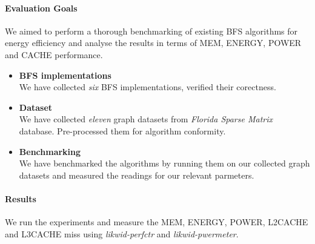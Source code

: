 \paragraph{Evaluation Goals}
We aimed to perform a thorough benchmarking of existing BFS algorithms
for energy efficiency and analyse the results in terms of MEM, ENERGY,
POWER and CACHE performance.
\begin{itemize}
\item
\textbf{BFS implementations}\\
We have collected \emph{six} BFS implementations, verified their
corectness.
\item
\textbf{Dataset}\\
We have collected \emph{eleven} graph datasets from
\emph{Florida Sparse Matrix} ~\cite{FLORIDA-SPARSE} database.
Pre-processed them for algorithm conformity.
\item
\textbf{Benchmarking}\\
We have benchmarked the algorithms by running them on our collected
graph datasets and measured the readings for our relevant parmeters.
\end{itemize}

\paragraph{Results}
We run the experiments and measure the MEM, ENERGY, POWER, L2CACHE and
L3CACHE miss using \emph{likwid-perfctr} and \emph{likwid-pwermeter}.


